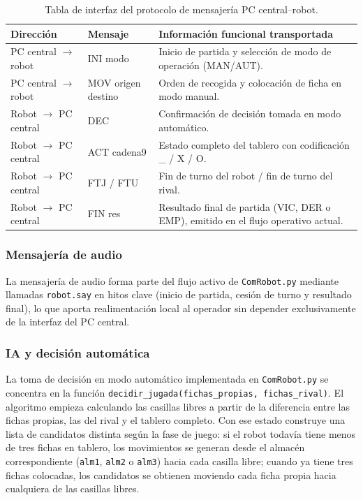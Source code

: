 \documentclass[12pt,a4paper]{article}
\begin{document}
\begin{table}[H]
\centering
\footnotesize
\begin{tabular}{P{0.15\textwidth} P{0.21\textwidth} P{0.56\textwidth}}
\toprule
\textbf{Direcci\'on} & \textbf{Mensaje} & \textbf{Informaci\'on funcional transportada} \\
\midrule
PC central $\rightarrow$ robot & INI modo & Inicio de partida y selecci\'on de modo de operaci\'on (MAN/AUT). \\
PC central $\rightarrow$ robot & MOV origen destino & Orden de recogida y colocaci\'on de ficha en modo manual. \\
Robot $\rightarrow$ PC central & DEC & Confirmaci\'on de decisi\'on tomada en modo autom\'atico. \\
Robot $\rightarrow$ PC central & ACT cadena9 & Estado completo del tablero con codificaci\'on \_ / X / O. \\
Robot $\rightarrow$ PC central & FTJ / FTU & Fin de turno del robot / fin de turno del rival. \\
Robot $\rightarrow$ PC central & FIN res & Resultado final de partida (VIC, DER o EMP), emitido en el flujo operativo actual. \\
\bottomrule
\end{tabular}
\caption{Tabla de interfaz del protocolo de mensajer\'ia PC central--robot.}
\end{table}

\subsubsection{Mensajer\'ia de audio}
La mensajer\'ia de audio forma parte del flujo activo de \texttt{ComRobot.py} mediante llamadas \texttt{robot.say} en hitos clave (inicio de partida, cesi\'on de turno y resultado final), lo que aporta realimentaci\'on local al operador sin depender exclusivamente de la interfaz del PC central.

\subsubsection{IA y decisi\'on autom\'atica}
La toma de decisi\'on en modo autom\'atico implementada en \texttt{ComRobot.py} se concentra en la funci\'on \texttt{decidir\_jugada(fichas\_propias, fichas\_rival)}. El algoritmo empieza calculando las casillas libres a partir de la diferencia entre las fichas propias, las del rival y el tablero completo. Con ese estado construye una lista de candidatos distinta seg\'un la fase de juego: si el robot todav\'ia tiene menos de tres fichas en tablero, los movimientos se generan desde el almac\'en correspondiente (\texttt{alm1}, \texttt{alm2} o \texttt{alm3}) hacia cada casilla libre; cuando ya tiene tres fichas colocadas, los candidatos se obtienen moviendo cada ficha propia hacia cualquiera de las casillas libres.
\end{document}
